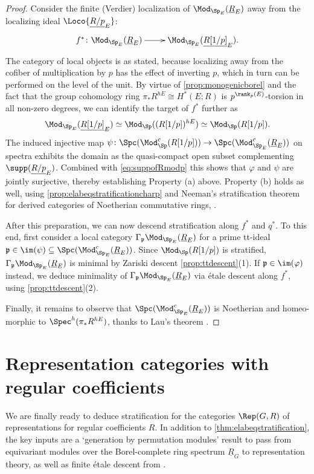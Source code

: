 \documentclass{amsart}%
\numberwithin{equation}{section}%
\theoremstyle{remark}
\begin{document}
\begin{proof}
Consider the finite (Verdier) localization of $\Mod_{\Sp_{E}}(\underline{R}_E)$ away from the localizing ideal $\Loco{\underline{R/p}_E}$:
\[
\xymatrix{f^*\colon \Mod_{\Sp_{E}}(\underline{R}_E) \ar[r] & \Mod_{\Sp_{E}}(\underline{R[1/p]}_E).}
\]
The category of local objects is as stated, because localizing away from the cofiber of multiplication by $p$ has the effect of inverting $p$, which in turn can be performed on the level of the unit. By virtue of \cref{prop:monogenicborel} and the fact that the group cohomology ring $\pi_*R^{hE} \cong H^*(E;R)$ is $p^{\rank_p(E)}$-torsion in all non-zero degrees, we can identify the target of $f^*$ further as 
\[
\Mod_{\Sp_{E}}(\underline{R[1/p]}_E) \simeq \Mod_{\Sp}((R[1/p])^{hE}) \simeq \Mod_{\Sp}(R[1/p]).
\]
The induced injective map $\psi\colon \Spc(\Mod_{\Sp}^c(R[1/p])) \to \Spc(\Mod_{\Sp_{E}}^c(\underline{R}_E))$ on spectra exhibits the domain as the quasi-compact open subset complementing $\supp(\underline{R/p}_E)$. Combined with \eqref{eq:suppofRmodp} this shows that $\varphi$ and $\psi$ are jointly surjective, thereby establishing Property (a) above. Property (b) holds as well, using \cref{prop:elabeqstratificationcharp} and Neeman's stratification theorem for derived categories of Noetherian commutative rings, \cite[Thm.~2.8]{Neeman92a}.

After this preparation, we can now descend stratification along $f^*$ and $q^*$. To this end, first consider a local category $\Gamma_{\frak p}\Mod_{\Sp_{E}}(\underline{R}_E)$ for a prime tt-ideal $\frak p \in \im(\psi) \subseteq \Spc(\Mod_{\Sp_{E}}^c(\underline{R}_E))$. Since $\Mod_{\Sp}(R[1/p])$ is stratified, $\Gamma_{\frak p}\Mod_{\Sp_{E}}(\underline{R}_E)$ is minimal by Zariski descent \cref{prop:ttdescent}(1). If $\frak p \in \im(\varphi)$ instead, we deduce minimality of $\Gamma_{\frak p}\Mod_{\Sp_{E}}(\underline{R}_E)$ via \'etale descent along $f^*$, using \cref{prop:ttdescent}(2). 

Finally, it remains to observe that $\Spc(\Mod_{\Sp_{E}}^c(\underline{R}_E))$ is Noetherian and homeo-morphic to $\Spec^h(\pi_*R^{hE})$, thanks to Lau's theorem \cite{lau_spcdmstacks}.
\end{proof}




\section{Representation categories with regular coefficients}\label{sec:reptheory}

We are finally ready to deduce stratification for the categories $\Rep(G,R)$ of representations for regular coefficients $R$. In addition to \cref{thm:elabeqstratification}, the key inputs are a `generation by permutation modules' result to pass from equivariant modules over the Borel-complete ring spectrum $\underline{R}_G$ to representation theory, as well as finite \'etale descent from \cite{barthel_integral1}. 
\end{document}
